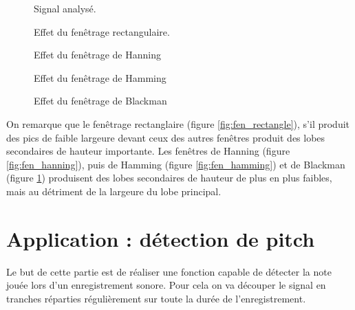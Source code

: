 \documentclass[french]{article}
\begin{document}
  
\begin{figure}[h!]
	\centering
	\begin{minipage}{\textwidth}
		\centering
		
		\caption{Signal analysé.}
		\label{fig:fen_signal}
	\end{minipage}
  	\begin{minipage}{\textwidth}
  		\centering
  		
  		\caption{Effet du fenêtrage rectangulaire.}
  		\label{fig:fen_rectangle}
  	\end{minipage}
  	\begin{minipage}{\textwidth}
  		\centering
  		
  		\caption{Effet du fenêtrage de Hanning}
  		\label{fig:fen_hanning}
	\end{minipage}
	\begin{minipage}{\textwidth}
		\centering
		
		\caption{Effet du fenêtrage de Hamming}
		\label{fig:fen_hamming}
	\end{minipage}
	\begin{minipage}{\textwidth}
		\centering
		
		\caption{Effet du fenêtrage de Blackman}
		\label{fig:fen_blackman}
	\end{minipage}
\end{figure}

On remarque que le fenêtrage rectanglaire (figure \ref{fig:fen_rectangle}), s'il produit des pics de faible largeure devant ceux des autres fenêtres produit des lobes secondaires de hauteur importante. Les fenêtres de Hanning (figure \ref{fig:fen_hanning}), puis de Hamming (figure \ref{fig:fen_hamming}) et de Blackman (figure \ref{fig:fen_blackman}) produisent des lobes secondaires de hauteur de plus en plus faibles, mais au détriment de la largeure du lobe principal.

\FloatBarrier
\newpage
\part{Application : détection de pitch}

Le but de cette partie est de réaliser une fonction capable de détecter la note jouée lors d'un enregistrement sonore. Pour cela on va découper le signal en tranches réparties régulièrement sur toute la durée de l'enregistrement.
\end{document}
